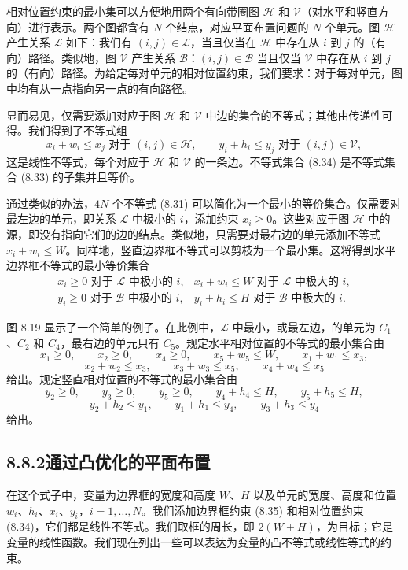 \documentclass[UTF8, 12pt, fontset=fandol, oneside]{ctexart}
\begin{document}
相对位置约束的最小集可以方便地用两个有向带圈图 $\mathcal H$ 和 $\mathcal V$（对水平和竖直方向）进行表示。两个图都含有 $N$ 个结点，对应平面布置问题的 $N$ 个单元。图 $\mathcal H$ 产生关系 $\mathcal L$ 如下：我们有 $(i,j)\in\mathcal L$，当且仅当在 $\mathcal H$ 中存在从 $i$ 到 $j$ 的（有向）路径。类似地，图 $\mathcal V$ 产生关系 $\mathcal B$：$(i,j)\in\mathcal B$ 当且仅当 $\mathcal V$ 中存在从 $i$ 到 $j$ 的（有向）路径。为给定每对单元的相对位置约束，我们要求：对于每对单元，图中均有从一点指向另一点的有向路径。

显而易见，仅需要添加对应于图 $\mathcal H$ 和 $\mathcal V$ 中边的集合的不等式；其他由传递性可得。我们得到了不等式组
\[
x_i+w_i\leq x_j \mbox{ 对于 } (i,j)\in\mathcal H,\qquad
y_i+h_i\leq y_j \mbox{ 对于 } (i,j)\in\mathcal V,
\tag{8.34}
\]
这是线性不等式，每个对应于 $\mathcal H$ 和 $\mathcal V$ 的一条边。不等式集合 (8.34) 是不等式集合 (8.33) 的子集并且等价。

通过类似的办法，$4N$ 个不等式 (8.31) 可以简化为一个最小的等价集合。仅需要对最左边的单元，即关系 $\mathcal L$ 中极小的 $i$，添加约束 $x_i\geq 0$。这些对应于图 $\mathcal H$ 中的源，即没有指向它们的边的结点。类似地，只需要对最右边的单元添加不等式 $x_i+w_i\leq W$。同样地，竖直边界框不等式可以剪枝为一个最小集。这将得到水平边界框不等式的最小等价集合
\[
\begin{array}{ll}
x_i\geq 0 \mbox{ 对于 } \mathcal L \mbox{ 中极小的 } i, & x_i+w_i\leq W \mbox{ 对于 } \mathcal L \mbox{ 中极大的 } i,\\
y_i\geq 0 \mbox{ 对于 } \mathcal B \mbox{ 中极小的 } i, & y_i+h_i\leq H \mbox{ 对于 } \mathcal B \mbox{ 中极大的 } i.
\end{array}
\tag{8.35}
\]

图 8.19 显示了一个简单的例子。在此例中，$\mathcal L$ 中最小，或最左边，的单元为 $C_1$、$C_2$ 和 $C_4$，最右边的单元只有 $C_5$。规定水平相对位置的不等式的最小集合由
\[
x_1\geq 0,\qquad x_2\geq 0,\qquad x_4\geq 0,\qquad x_5+w_5\leq W,\qquad x_1+w_1\leq x_3,
\]
\[
x_2+w_2\leq x_3,\qquad x_3+w_3\leq x_5,\qquad x_4+w_4\leq x_5
\]
给出。规定竖直相对位置的不等式的最小集合由
\[
y_2\geq 0,\qquad y_3\geq 0,\qquad y_5\geq 0,\qquad y_4+h_4\leq H,\qquad y_5+h_5\leq H,
\]
\[
y_2+h_2\leq y_1,\qquad y_1+h_1\leq y_4,\qquad y_3+h_3\leq y_4
\]
给出。

\subsection*{8.8.2\quad 通过凸优化的平面布置}

在这个式子中，变量为边界框的宽度和高度 $W$、$H$ 以及单元的宽度、高度和位置 $w_i$、$h_i$、$x_i$、$y_i$，$i=1,\ldots,N$。我们添加边界框约束 (8.35) 和相对位置约束 (8.34)，它们都是线性不等式。我们取框的周长，即 $2(W+H)$，为目标；它是变量的线性函数。我们现在列出一些可以表达为变量的凸不等式或线性等式的约束。
\end{document}
